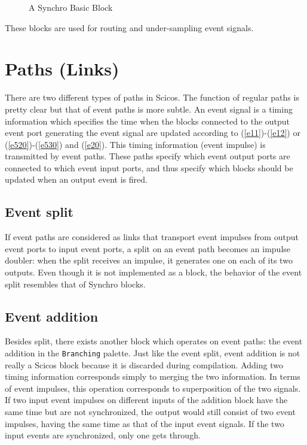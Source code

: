 \documentclass{book}
\newcommand{\logical}{{Synchro }}
\begin{document}
\begin{figure}[ht]

\caption{A \logical Basic Block}
\label{lbb}
\end{figure}

These blocks are used for routing and 
under-sampling event signals. 

\section{Paths (Links)}
There are two different types of paths in Scicos. The function of regular
paths is pretty clear but that of event paths is more subtle. An event
signal is a timing information which specifies the time when the
blocks connected to the output event port generating the event signal
are updated according to (\ref{e11})-(\ref{e12}) or
(\ref{e520})-(\ref{e530}) and (\ref{e20}). This
timing information (event impulse) is transmitted by event
paths. These paths specify which event output ports are connected to
which event input ports, and thus specify which blocks should be
updated when an output event is fired. 

\subsection{Event split}
If event paths are considered
as links that transport event impulses from output event ports to
input event ports, a split on an event path becomes an impulse
doubler: when the split receives an impulse, it generates one on each
of its two outputs. Even though it is not implemented as a block,
the behavior of the event split resembles that of \logical blocks.

\subsection{Event addition}
Besides split, there exists another block which operates on event
paths: the event addition in the {\tt Branching} palette. 
Just like the event split, event addition is
not really a Scicos   block because it is discarded during compilation.
Adding two timing information corresponds simply to merging the two
information. In terms of event impulses, this operation corresponds to
superposition of the two signals. If two input event impulses on
different inputs of the 
addition block have the same time but are not synchronized, the output
would still consist of two event impulses, having the same time as that
of the input event signals. If the two input events are synchronized,
only one gets through.

\end{document}

